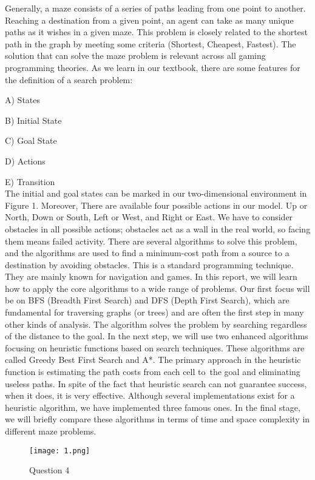 \documentclass[]{article}
\begin{document}
Generally, a maze consists of a series of paths leading from one point to another. Reaching a destination from a given point, an agent can take as many unique paths as it wishes in a given maze. This problem is closely related to the shortest path in the graph by meeting some criteria (Shortest, Cheapest, Fastest). The solution that can solve the maze problem is relevant across all gaming programming theories. As we learn in our textbook, there are some features for the definition of a search problem: 
\item A) States
\item B) Initial State
\item C) Goal State
\item D) Actions
\item E) Transition
\\
The initial and goal states can be marked in our two-dimensional environment in Figure 1. Moreover, There are available four possible actions in our model. Up or North, Down or South, Left or West, and Right or East. We have to consider obstacles in all possible actions; obstacles act as a wall in the real world, so facing them means failed activity.
There are several algorithms to solve this problem, and the algorithms are used to find a minimum-cost path from a source to a destination by avoiding obstacles. This is a standard programming technique. They are mainly known for navigation and games. In this report, we will learn how to apply the core algorithms to a wide range of problems. Our first focus will be on BFS (Breadth First Search) and DFS (Depth First Search), which are fundamental for traversing graphs (or trees) and are often the first step in many other kinds of analysis. The algorithm solves the problem by searching regardless of the distance to the goal. In the next step, we will use two enhanced algorithms focusing on heuristic functions based on search techniques. These algorithms are called Greedy Best First Search and A*. The primary approach in the heuristic function is estimating the path costs from each cell to the goal and eliminating useless paths. In spite of the fact that heuristic search can not guarantee success, when it does, it is very effective. Although several implementations exist for a heuristic algorithm, we have implemented three famous ones. In the final stage, we will briefly compare these algorithms in terms of time and space complexity in different maze problems.

\begin{figure}[!h]
\centering
\texttt{[image: 1.png]}
\caption{Question 4}
\end{figure}
\end{document}
